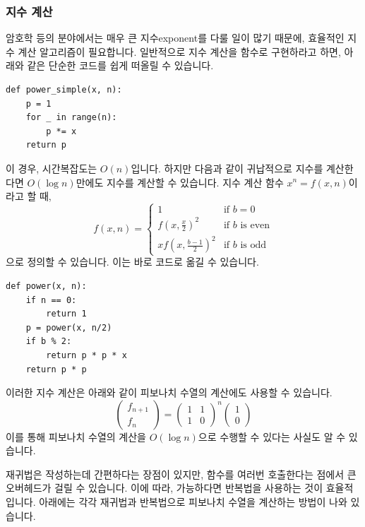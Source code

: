 \documentclass[../main.tex]{subfiles}
\begin{document}
\subsubsection{지수 계산}
암호학 등의 분야에서는 매우 큰 지수exponent를 다룰 일이 많기 때문에, 효율적인 지수 계산 알고리즘이 필요합니다.
일반적으로 지수 계산을 함수로 구현하라고 하면, 아래와 같은 단순한 코드를 쉽게 떠올릴 수 있습니다.
\begin{verbatim}
def power_simple(x, n):
	p = 1
	for _ in range(n):
		p *= x
	return p
\end{verbatim}
이 경우, 시간복잡도는 $O(n)$입니다.
하지만 다음과 같이 귀납적으로 지수를 계산한다면 $O(\log n)$만에도 지수를 계산할 수 있습니다.
지수 계산 함수 $x^n = f(x, n)$이라고 할 때,
\[
f(x, n) = \begin{cases}
1 & \text{if } b = 0\\
f\left(x, \frac x2 \right)^2 & \text{if } b \text{ is even}\\
x f\left(x, \frac{b - 1}{2}\right)^2 & \text{if } b \text{ is odd}
\end{cases}
\]
으로 정의할 수 있습니다.
이는 바로 코드로 옮길 수 있습니다.
\begin{verbatim}
def power(x, n):
	if n == 0:
		return 1
	p = power(x, n/2)
	if b % 2:
		return p * p * x
	return p * p
\end{verbatim}
이러한 지수 계산은 아래와 같이 피보나치 수열의 계산에도 사용할 수 있습니다.
\[
\begin{pmatrix}f_{n + 1} \\ f_n \end{pmatrix} = \begin{pmatrix}1 & 1 \\ 1 & 0 \end{pmatrix}^n \begin{pmatrix} 1 \\ 0 \end{pmatrix}
\]
이를 통해 피보나치 수열의 계산을 $O(\log n)$으로 수행할 수 있다는 사실도 알 수 있습니다.

재귀법은 작성하는데 간편하다는 장점이 있지만, 함수를 여러번 호출한다는 점에서 큰 오버헤드가 걸릴 수 있습니다.
이에 따라, 가능하다면 반복법을 사용하는 것이 효율적입니다.
아래에는 각각 재귀법과 반복법으로 피보나치 수열을 계산하는 방법이 나와 있습니다.
\end{document}
